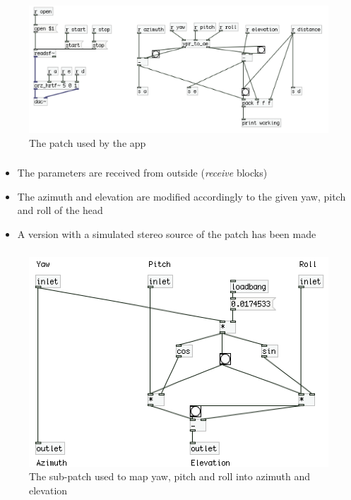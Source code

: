\documentclass{beamer}
\begin{document}
	\begin{frame}
		\frametitle{\insertsection}
		\begin{figure}
			\centering
			  \includegraphics[width=1.0\textwidth]{images/iOS_patch.png}
			  \caption{The patch used by the app}
			  \label{fig:ios_pd}
		\end{figure}
	\end{frame}

	\begin{frame}
		\frametitle{\insertsection}
		\begin{itemize}
			\item The parameters are received from outside ({\em receive} blocks)
			\item The azimuth and elevation are modified accordingly to
				the given yaw, pitch and roll of the head
			\item A version with a simulated stereo source of the patch has been made
		\end{itemize}
	\end{frame}

	\begin{frame}
		\frametitle{\insertsection}
		\begin{figure}
			\centering
			\includegraphics[width=1.0\textheight]{images/iOS_patch_conversion.png}
			\caption{The sub-patch used to map yaw, pitch and roll \newline into azimuth and elevation}
		\end{figure}
	\end{frame}
\end{document}

